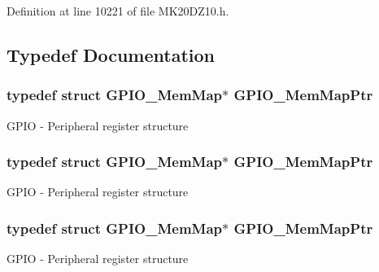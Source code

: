 Definition at line 10221 of file M\+K20\+D\+Z10.\+h.



\subsection{Typedef Documentation}
\subsubsection[{\texorpdfstring{G\+P\+I\+O\+\_\+\+Mem\+Map\+Ptr}{GPIO_MemMapPtr}}]{\setlength{\rightskip}{0pt plus 5cm}typedef struct {\bf G\+P\+I\+O\+\_\+\+Mem\+Map}$\ast$ {\bf G\+P\+I\+O\+\_\+\+Mem\+Map\+Ptr}}\hypertarget{group___g_p_i_o___peripheral_ga31c1eddda45aa085f51142987e05ada5}{}\label{group___g_p_i_o___peripheral_ga31c1eddda45aa085f51142987e05ada5}
G\+P\+IO -\/ Peripheral register structure 
\subsubsection[{\texorpdfstring{G\+P\+I\+O\+\_\+\+Mem\+Map\+Ptr}{GPIO_MemMapPtr}}]{\setlength{\rightskip}{0pt plus 5cm}typedef struct {\bf G\+P\+I\+O\+\_\+\+Mem\+Map}$\ast$ {\bf G\+P\+I\+O\+\_\+\+Mem\+Map\+Ptr}}\hypertarget{group___g_p_i_o___peripheral_ga31c1eddda45aa085f51142987e05ada5}{}\label{group___g_p_i_o___peripheral_ga31c1eddda45aa085f51142987e05ada5}
G\+P\+IO -\/ Peripheral register structure 
\subsubsection[{\texorpdfstring{G\+P\+I\+O\+\_\+\+Mem\+Map\+Ptr}{GPIO_MemMapPtr}}]{\setlength{\rightskip}{0pt plus 5cm}typedef struct {\bf G\+P\+I\+O\+\_\+\+Mem\+Map}$\ast$ {\bf G\+P\+I\+O\+\_\+\+Mem\+Map\+Ptr}}\hypertarget{group___g_p_i_o___peripheral_ga31c1eddda45aa085f51142987e05ada5}{}\label{group___g_p_i_o___peripheral_ga31c1eddda45aa085f51142987e05ada5}
G\+P\+IO -\/ Peripheral register structure 